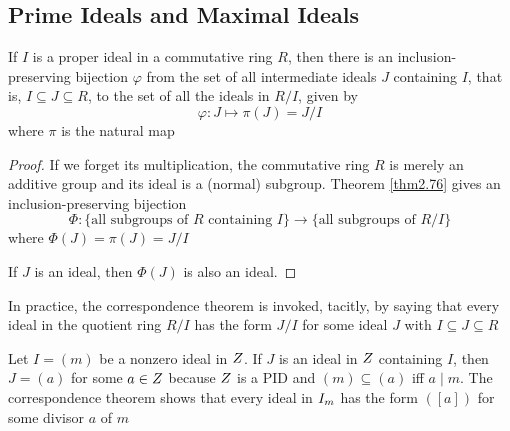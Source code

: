 \documentclass[11pt]{article}
\begin{document}
\subsection{Prime Ideals and Maximal Ideals}
\label{sec:org7227b0c}
\begin{proposition}
If \(I\) is a proper ideal in a commutative ring \(R\), then there is an
inclusion-preserving bijection \(\varphi\) from the set of all intermediate ideals \(J\)
containing \(I\), that is, \(I\subseteq J\subseteq R\), to the set of all the
ideals in \(R/I\), given by
\begin{equation*}
\varphi:J\mapsto\pi(J)=J/I
\end{equation*}
where \(\pi\) is the natural map
\begin{center}
\end{center}
\end{proposition}

\begin{proof}
If we forget its multiplication, the commutative ring \(R\) is merely an
additive group and its ideal is a (normal) subgroup. Theorem \ref{thm2.76}
gives an inclusion-preserving bijection
\begin{equation*}
\Phi:\{\text{all subgroups of $R$ containing $I$}\}\to 
\{\text{all subgroups of $R/I$}\}
\end{equation*}
where \(\Phi(J)=\pi(J)=J/I\)

If \(J\) is an ideal, then \(\Phi(J)\) is also an ideal.
\end{proof}

In practice, the correspondence theorem is invoked, tacitly, by saying that
every ideal in the quotient ring \(R/I\) has the form \(J/I\) for some ideal
\(J\) with \(I\subseteq J\subseteq R\)

\begin{examplle}[]
Let \(I=(m)\) be a nonzero ideal in \(\relax{Z}\). If \(J\) is an ideal in \(\relax{Z}\)
containing \(I\), then \(J=(a)\) for some \(a\in\relax{Z}\) because \(\relax{Z}\) is a PID
and \((m)\subseteq(a)\) iff \(a\mid m\). The correspondence theorem shows
that every ideal in \(\relax{I}_m\) has the form \(([a])\) for some divisor \(a\) of \(m\)
\end{examplle}
\end{document}
